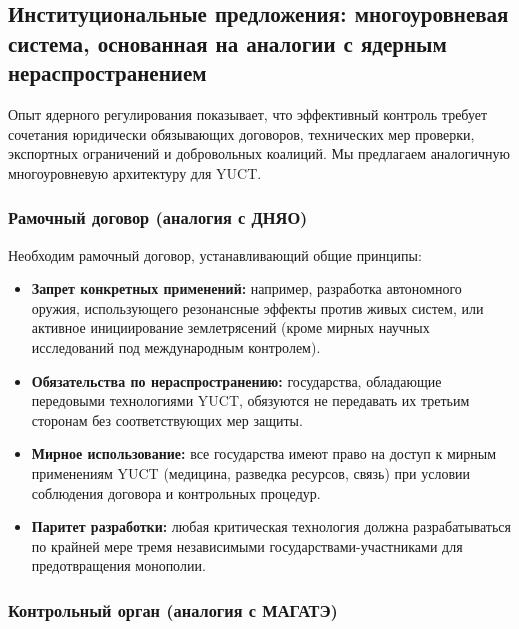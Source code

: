 \documentclass[12pt,a4paper]{article}
\theoremstyle{remark}
\begin{document}
	\subsection{Институциональные предложения: многоуровневая система, основанная на аналогии с ядерным нераспространением}
	\label{subsec:institutions}
	
	Опыт ядерного регулирования показывает, что эффективный контроль требует сочетания юридически обязывающих договоров, технических мер проверки, экспортных ограничений и добровольных коалиций. Мы предлагаем аналогичную многоуровневую архитектуру для YUCT.
	
	\subsubsection{Рамочный договор (аналогия с ДНЯО)}
	
	Необходим рамочный договор, устанавливающий общие принципы:
	\begin{itemize}
		\item \textbf{Запрет конкретных применений:} например, разработка автономного оружия, использующего резонансные эффекты против живых систем, или активное инициирование землетрясений (кроме мирных научных исследований под международным контролем).
		\item \textbf{Обязательства по нераспространению:} государства, обладающие передовыми технологиями YUCT, обязуются не передавать их третьим сторонам без соответствующих мер защиты.
		\item \textbf{Мирное использование:} все государства имеют право на доступ к мирным применениям YUCT (медицина, разведка ресурсов, связь) при условии соблюдения договора и контрольных процедур.
		\item \textbf{Паритет разработки:} любая критическая технология должна разрабатываться по крайней мере тремя независимыми государствами-участниками для предотвращения монополии.
	\end{itemize}
	
	\subsubsection{Контрольный орган (аналогия с МАГАТЭ)}
	
\end{document}

